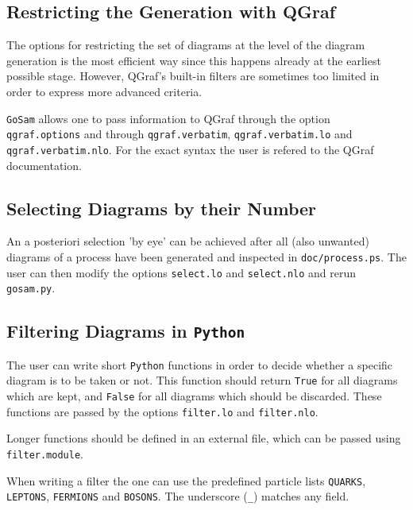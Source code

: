 \documentclass[11pt,a4paper]{refrep}
\newcommand{\golemversion}{{1{.}0}}
\newcommand{\golemv}[1][\golemversion]{{\tt GoSam}\xspace}
\newcommand{\python}{{\tt Python}\xspace}
\begin{document}
\subsection{Restricting the Generation with QGraf}
The options for restricting the set of diagrams at the level
of the diagram generation is the most efficient way since this
happens already at the earliest possible stage.
However, QGraf's built-in filters are sometimes
too limited in order to express more advanced criteria.

\golemv{} allows one to pass information to QGraf through the option
\texttt{qgraf.options} and through \texttt{qgraf.verbatim},
\texttt{qgraf.verbatim.lo} and \texttt{qgraf.verbatim.nlo}.
For the exact syntax the user is refered to the QGraf documentation.

\subsection{Selecting Diagrams by their Number}
An a posteriori selection 'by eye' can be achieved after all (also unwanted)
diagrams of a process have been generated and inspected in
\texttt{doc/process.ps}. The user can then modify the options
\texttt{select.lo} and \texttt{select.nlo} and rerun \texttt{gosam.py}.


\subsection{Filtering Diagrams in \python{}}
The user can write short \python{} functions in order to decide whether
a specific diagram is to be taken or not. This function should return
\texttt{True} for all diagrams which are kept, and \texttt{False} for
all diagrams which should be discarded. These functions are passed by
the options \texttt{filter.lo} and \texttt{filter.nlo}.

Longer functions should be defined in an external file, which can be
passed using \texttt{filter.module}.

When writing a filter the one can use the predefined particle lists
\texttt{QUARKS}, \texttt{LEPTONS}, \texttt{FERMIONS} and \texttt{BOSONS}.
The underscore (\texttt{\_}) matches any field.
\end{document}
